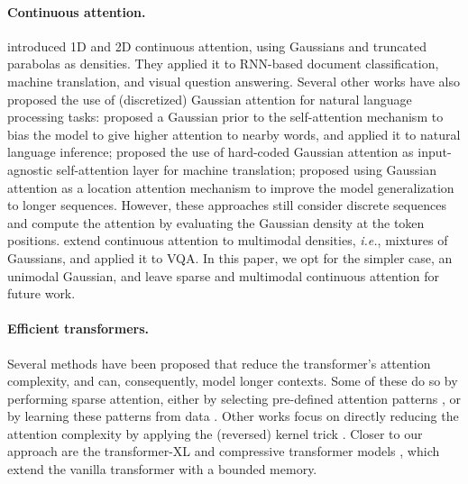 \documentclass[11pt]{article}
\begin{document}
\paragraph{Continuous attention. }
\citet{martins2020sparse} introduced 1D and 2D continuous attention, using Gaussians and truncated parabolas as densities. They applied it to RNN-based document classification, machine translation, and visual question answering.
Several other works have also proposed the use of (discretized) Gaussian attention for natural language processing tasks: \citet{guo2019gaussian} proposed a Gaussian prior to the self-attention mechanism to bias the model to give higher attention to nearby words, and applied it to natural language inference;
\citet{you2020hard} proposed the use of hard-coded Gaussian attention as input-agnostic self-attention layer for machine translation; \citet{dubois2020location} proposed using Gaussian attention as a location attention mechanism to improve the model generalization to longer sequences. However, these approaches still consider discrete sequences and compute the attention by evaluating the Gaussian density at the token positions. 
\citet{Farinhas2021MultimodalCV} extend continuous attention to multimodal densities, \textit{i.e.}, mixtures of Gaussians, and applied it to VQA. In this paper, we opt for the simpler case, an unimodal Gaussian, and leave sparse and multimodal continuous attention for future work. 


\paragraph{Efficient transformers. }
Several methods have been proposed that reduce the transformer's attention complexity, and can, consequently, model longer contexts. Some of these do so by performing sparse attention, either by selecting pre-defined attention patterns \citep{child2019generating,beltagy2020longformer,zaheer2020big}, or by learning these patterns from data \citep{kitaev2020reformer,vyas2020fast,tay2020sparse,roy2021efficient,wang2021cluster}. 
Other works focus on directly reducing the attention complexity by 
applying the (reversed) kernel trick 
\citep{katharopoulos2020transformers,choromanski2020rethinking,peng2021random,jaegle2021perceiver}. 
Closer to our approach are the transformer-XL and compressive transformer models \citep{dai2019transformer, rae2019compressive}, which extend the vanilla transformer with a bounded memory.
\end{document}

